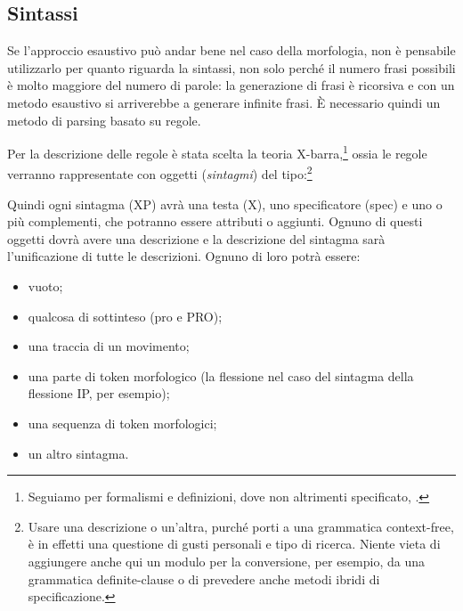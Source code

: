 \documentclass[twoside,stylearticle,11pt,filologia,it,article,bibsection]{spinoza}
\begin{document}
\subsection{Sintassi}

\label{sec:conssintassi}

Se l'approccio esaustivo può andar bene nel caso della morfologia, non
è pensabile utilizzarlo per quanto riguarda la sintassi, non solo
perché il numero frasi possibili è molto maggiore del numero di
parole: la generazione di frasi è ricorsiva e con un metodo esaustivo
si arriverebbe a generare infinite frasi. È necessario quindi un
metodo di parsing basato su regole.

Per la descrizione delle regole è stata scelta la teoria
X-barra,\footnote{Seguiamo per formalismi e definizioni, dove non
  altrimenti specificato, .}  ossia le regole
verranno rappresentate con oggetti ({\it sintagmi}) del
tipo:\footnote{Usare una descrizione o un'altra, purché porti a una
  grammatica context-free, è in effetti una questione di gusti
  personali e tipo di ricerca. Niente vieta di aggiungere anche qui un
  modulo per la conversione, per esempio, da una grammatica
  definite-clause o di prevedere anche metodi ibridi di
  specificazione.}
\begin{lingeq}\label{eq:xbar}
\end{lingeq}

Quindi ogni sintagma (XP) avrà una testa (X), uno specificatore (spec)
e uno o più complementi, che potranno essere attributi o
aggiunti. Ognuno di questi oggetti dovrà avere una descrizione e la
descrizione del sintagma sarà l'unificazione di tutte le
descrizioni. Ognuno di loro potrà essere:
\begin{itemize}
\item vuoto;
\item qualcosa di sottinteso (pro e PRO);
\item una traccia di un movimento;
\item una parte di token morfologico (la flessione nel caso del
  sintagma della flessione IP, per esempio);
\item una sequenza di token morfologici;
\item un altro sintagma.
\end{itemize}
\end{document}
